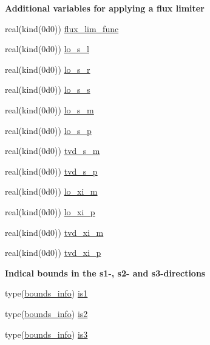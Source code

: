 \begin{Indent}\textbf{ Additional variables for applying a flux limiter}\par
\begin{DoxyCompactItemize}
\item 
real(kind(0d0)) \hyperlink{namespacem__riemann__solvers_a7af64bd01982bc9c8e40b9a662d106c5}{flux\+\_\+lim\+\_\+func}
\item 
real(kind(0d0)) \hyperlink{namespacem__riemann__solvers_a61bf6c3eebae289a1826c4acd303ae6e}{lo\+\_\+s\+\_\+l}
\item 
real(kind(0d0)) \hyperlink{namespacem__riemann__solvers_ae880c4216083a3203b42996f2010f080}{lo\+\_\+s\+\_\+r}
\item 
real(kind(0d0)) \hyperlink{namespacem__riemann__solvers_a28e9af865b5ffd2a8cef04c1004b3aea}{lo\+\_\+s\+\_\+s}
\item 
real(kind(0d0)) \hyperlink{namespacem__riemann__solvers_af7c9f253cc0584146992cc0b1858e888}{lo\+\_\+s\+\_\+m}
\item 
real(kind(0d0)) \hyperlink{namespacem__riemann__solvers_a62f6549c30232e14a06efa8dfe7f19a4}{lo\+\_\+s\+\_\+p}
\item 
real(kind(0d0)) \hyperlink{namespacem__riemann__solvers_a1b9d56d4ae46805db6489e72a09f765b}{tvd\+\_\+s\+\_\+m}
\item 
real(kind(0d0)) \hyperlink{namespacem__riemann__solvers_aa0a8636a3aef10f1989ce432bd825bf5}{tvd\+\_\+s\+\_\+p}
\item 
real(kind(0d0)) \hyperlink{namespacem__riemann__solvers_adeb97ac789df26b14a090d09fb8598b7}{lo\+\_\+xi\+\_\+m}
\item 
real(kind(0d0)) \hyperlink{namespacem__riemann__solvers_aad491932ac39e9c830cb24d395a00c3c}{lo\+\_\+xi\+\_\+p}
\item 
real(kind(0d0)) \hyperlink{namespacem__riemann__solvers_ad13ea7f1ad55e7119a36ca61bb353ded}{tvd\+\_\+xi\+\_\+m}
\item 
real(kind(0d0)) \hyperlink{namespacem__riemann__solvers_a5e4f81b0b96e326a19154e0a4b8ae01a}{tvd\+\_\+xi\+\_\+p}
\end{DoxyCompactItemize}
\end{Indent}
\begin{Indent}\textbf{ Indical bounds in the s1-\/, s2-\/ and s3-\/directions}\par
\begin{DoxyCompactItemize}
\item 
type(\hyperlink{structm__derived__types_1_1bounds__info}{bounds\+\_\+info}) \hyperlink{namespacem__riemann__solvers_ad7ef4f9e239961cacd291ee2e31bf0be}{is1}
\item 
type(\hyperlink{structm__derived__types_1_1bounds__info}{bounds\+\_\+info}) \hyperlink{namespacem__riemann__solvers_ad0d94c92ddccee51dc2412707fcab447}{is2}
\item 
type(\hyperlink{structm__derived__types_1_1bounds__info}{bounds\+\_\+info}) \hyperlink{namespacem__riemann__solvers_a90256be0540e3f9279305be0e9ab32f4}{is3}
\end{DoxyCompactItemize}
\end{Indent}


